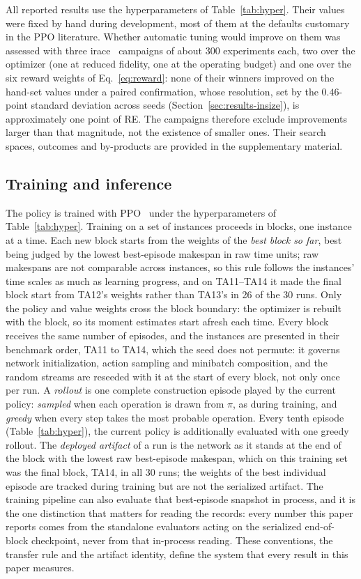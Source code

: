 \documentclass[preprint,12pt]{elsarticle}
\theoremstyle{definition}
\theoremstyle{remark}
\begin{document}
All reported results use the hyperparameters of
Table~\ref{tab:hyper}. Their values were fixed by hand during
development, most of them at the defaults customary in the PPO
literature. Whether automatic tuning would improve on them was
assessed with three irace~\citep{LopezIbanez2016} campaigns of about
$300$ experiments each, two over the optimizer (one at reduced
fidelity, one at the operating budget) and one over the six reward
weights of Eq.~\eqref{eq:reward}: none of their winners improved on
the hand-set values under a paired confirmation, whose resolution,
set by the $0.46$-point standard deviation across seeds
(Section~\ref{sec:results-insize}), is approximately one point of RE.
The campaigns therefore exclude improvements larger than that
magnitude, not the existence of smaller ones. Their search spaces,
outcomes and by-products are provided in the supplementary
material.

\subsection{Training and inference}
\label{sec:training}

The policy is trained with PPO~\citep{Schulman2017} under the
hyperparameters of Table~\ref{tab:hyper}. Training on a set of
instances proceeds in blocks, one instance at a time. Each new block
starts from the weights of the \emph{best block so far}, best being
judged by the lowest best-episode makespan in raw time units; raw
makespans are not comparable across instances, so this rule follows
the instances' time scales as much as learning progress, and on
TA11--TA14 it made the final block start from TA12's weights rather
than TA13's in 26 of the 30 runs. Only the policy and value weights
cross the block boundary: the optimizer is rebuilt with the block, so
its moment estimates start afresh each time. Every block receives the same
number of episodes, and the instances are presented in their
benchmark order, TA11 to TA14, which the seed does not permute: it
governs network initialization, action sampling and minibatch
composition, and the random streams are reseeded with it at the start
of every block, not only once per run.
A \emph{rollout} is one complete construction episode
played by the current policy: \emph{sampled} when each operation is
drawn from $\pi$, as during training, and \emph{greedy} when every
step takes the most probable operation. Every tenth episode
(Table~\ref{tab:hyper}), the current policy is additionally evaluated
with one greedy rollout. The \emph{deployed artifact} of a run is
the network as it stands at the end of the block with the lowest raw
best-episode makespan, which on this training set was the final
block, TA14, in all 30 runs; the weights of the best individual
episode are tracked during training but are not the serialized
artifact. The training pipeline can also evaluate that best-episode
snapshot in process, and it is the one distinction that matters for
reading the records: every number this paper reports comes from the
standalone evaluators acting on the serialized end-of-block
checkpoint, never from that in-process reading. These conventions,
the transfer rule and the artifact identity, define the system that
every result in this paper measures.
\end{document}
